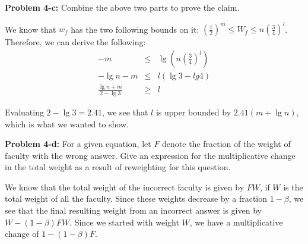 \documentclass[psamsfonts]{amsart}
\newenvironment{sol}{\vspace{0.25cm}{\large \bfseries Solution:}}{\qedsymbol}
\newenvironment{prob}[1]{\begin{framed}{\large \bfseries Problem #1:}}{\end{framed}}
\begin{document}
\begin{prob}{4-c}
Combine the above two parts to prove the claim.
\end{prob}
\begin{sol}
We know that $w_f$ has the two following bounds on it: $\left( \frac{1}{2} \right)^m \leq W_f \leq n \left( \frac{3}{4} \right)^l$. Therefore, we can derive the following:
\begin{eqnarray}
-m &\leq& \lg \left( n \left( \frac{3}{4} \right)^l \right) \\
-\lg n - m &\leq& l (\lg 3 - lg 4) \\
\frac{\lg n + m}{2 - \lg 3} &\geq& l
\end{eqnarray}

Evaluating $2 - \lg 3 = 2.41$, we see that $l$ is upper bounded by $2.41(m + \lg n)$, which is what we wanted to show.
\end{sol}

\begin{prob}{4-d}
For a given equation, let $F$ denote the fraction of the weight of faculty with the wrong answer. Give an expression for the multiplicative change in the total weight as a result of reweighting for this question.
\end{prob}

\begin{sol}
We know that the total weight of the incorrect faculty is given by $FW$, if $W$ is the total weight of all the faculty. Since these weights decrease by a fraction $1 - \beta$, we see that the final resulting weight from an incorrect answer is given by $W - (1 - \beta)FW$. Since we started with weight $W$, we have a multiplicative change of $1 - (1 - \beta)F$. 
\end{sol}
\end{document}
